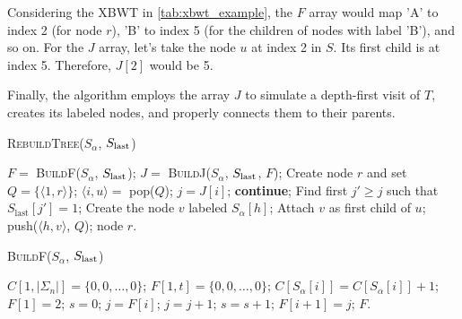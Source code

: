 \begin{example}
    Considering the XBWT in \cref{tab:xbwt_example}, the $F$ array would map 'A' to index 2 (for node $r$), 'B' to index 5 (for the children of nodes with label 'B'), and so on. For the $J$ array, let's take the node $u$ at index 2 in $S$. Its first child is at index 5. Therefore, $J[2]$ would be 5.
\end{example}

Finally, the algorithm employs the array $J$ to
simulate a depth-first visit of $T$, creates its labeled nodes, and properly connects them to their parents. 

\begin{algorithm}[H]
    \caption{\textsc{RebuildTree}($S_\alpha$, $S_\textup{last}$)}
    \label{alg:rebuildTree}
    \begin{algorithmic}[1]
    \State $F = $ \textsc{BuildF}($S_\alpha$, $S_{\textup{last}}$);
    \State $J = $ \textsc{BuildJ}($S_\alpha$, $S_{\textup{last}}$, $F$);
    \State Create node $r$ and set $Q = \{\langle1, r\rangle\}$; 
     
        \State $\langle i, u \rangle = $ pop($Q$);
        \State $j = J[i]$; 
         
            \State \textbf{continue};
        \EndIf
        \State Find first $j' \geq j$ such that $S_{\text{last}}[j'] = 1$; 
            \State Create the node $v$ labeled $S_\alpha[h]$;
            \State Attach $v$ as first child of $u$;
            \State push($\langle h, v \rangle$, $Q$);
        \EndFor
    \EndWhile
    \State \Return node $r$.
    \end{algorithmic}
\end{algorithm}

\begin{algorithm}[H]
    \caption{\textsc{BuildF}($S_\alpha$, $S_{\textup{last}}$)}
    \label{alg:buildF}
    \begin{algorithmic}[1]
    \State $C[1,|\Sigma_n|] = \{0, 0, \dots, 0\}$;
    \State $F[1,t] = \{0, 0, \dots, 0\}$;
        \State $C[S_\alpha[i]] = C[S_\alpha[i]] + 1$; 
    \EndFor
    \State $F[1] = 2$; 
     
        \State $s = 0$; $j = F[i]$;
         
            \State $j = j + 1$;
             
                \State $s = s + 1$;
            \EndIf
        \EndWhile
        \State $F[i+1] = j$;
    \EndFor
    \State \Return $F$.
    \end{algorithmic}
\end{algorithm}
    
